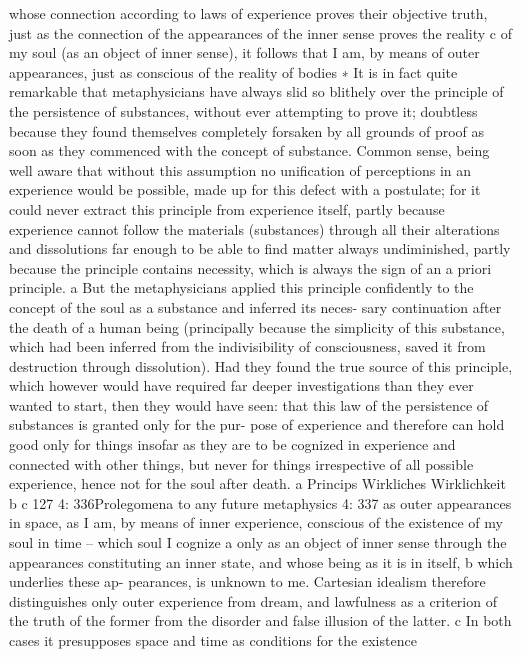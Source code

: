 whose connection according to laws of experience proves their objective
truth, just as the connection of the appearances of the inner sense proves
the reality c of my soul (as an object of inner sense), it follows that I am,
by means of outer appearances, just as conscious of the reality of bodies
∗ It is in fact quite remarkable that metaphysicians have always slid so blithely
over the principle of the persistence of substances, without ever attempting to
prove it; doubtless because they found themselves completely forsaken by all
grounds of proof as soon as they commenced with the concept of substance.
Common sense, being well aware that without this assumption no uniﬁcation
of perceptions in an experience would be possible, made up for this defect
with a postulate; for it could never extract this principle from experience itself,
partly because experience cannot follow the materials (substances) through all
their alterations and dissolutions far enough to be able to ﬁnd matter always
undiminished, partly because the principle contains necessity, which is always
the sign of an a priori principle. a But the metaphysicians applied this principle
conﬁdently to the concept of the soul as a substance and inferred its neces-
sary continuation after the death of a human being (principally because the
simplicity of this substance, which had been inferred from the indivisibility
of consciousness, saved it from destruction through dissolution). Had they
found the true source of this principle, which however would have required
far deeper investigations than they ever wanted to start, then they would have
seen: that this law of the persistence of substances is granted only for the pur-
pose of experience and therefore can hold good only for things insofar as they
are to be cognized in experience and connected with other things, but never
for things irrespective of all possible experience, hence not for the soul after
death.
a Princips
Wirkliches
Wirklichkeit
b
c
127
4: 336Prolegomena to any future metaphysics
4: 337
as outer appearances in space, as I am, by means of inner experience,
conscious of the existence of my soul in time – which soul I cognize a
only as an object of inner sense through the appearances constituting an
inner state, and whose being as it is in itself, b which underlies these ap-
pearances, is unknown to me. Cartesian idealism therefore distinguishes
only outer experience from dream, and lawfulness as a criterion of the
truth of the former from the disorder and false illusion of the latter. c In
both cases it presupposes space and time as conditions for the existence
